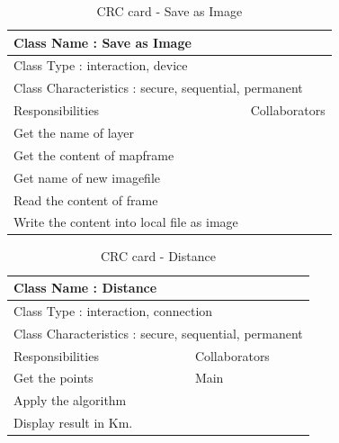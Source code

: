 \begin{table}[h]
\begin{tabular}{|p{7cm}|p{7cm}|}
  \hline
  \multicolumn{2}{|l|}{ Class Name : Save as Image} \\
  \hline
  \multicolumn{2}{|l|}{ Class Type : interaction, device} \\
  \hline
  \multicolumn{2}{|l|}{ Class Characteristics : secure, sequential, permanent} \\
  \hline
  Responsibilities & Collaborators  \\
  \hline
  Get the name of layer & \\
  Get the content of mapframe & \\
  Get name of new imagefile & \\
  Read the content of frame & \\
  Write the content into local file as image & \\
  \hline
\end{tabular}
\caption[CRC card - Save as Image]{CRC card - Save as Image}
\end{table}

\begin{table}[h]
\begin{tabular}{|p{7cm}|p{7cm}|}
  \hline
  \multicolumn{2}{|l|}{ Class Name : Distance} \\
  \hline
  \multicolumn{2}{|l|}{ Class Type : interaction, connection} \\
  \hline
  \multicolumn{2}{|l|}{ Class Characteristics : secure, sequential, permanent} \\
  \hline
  Responsibilities & Collaborators  \\
  \hline
  Get the points & Main \\
  Apply the algorithm & \\
  Display result in Km. & \\
  \hline
\end{tabular}
\caption[CRC card - Distance]{CRC card - Distance}
\end{table}

